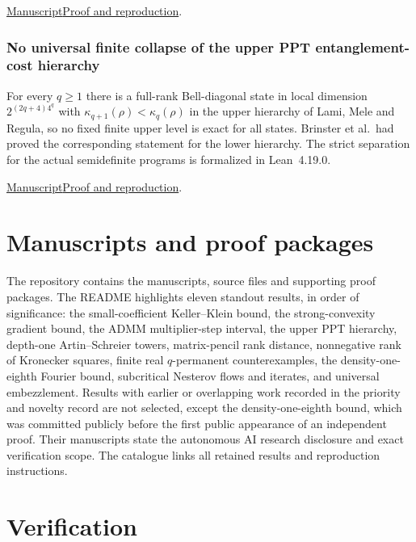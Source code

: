 \documentclass[11pt,a4paper]{article}
\begin{document}
\href{https://github.com/dvgyl/math-and-theory/blob/main/papers/physics/upb-tensor-rank/manuscript.pdf}{Manuscript}\quad\href{https://github.com/dvgyl/math-and-theory/blob/main/papers/physics/upb-tensor-rank/README.md}{Proof and reproduction}.

\subsubsection{No universal finite collapse of the upper PPT entanglement-cost hierarchy}

For every $q\ge1$ there is a full-rank Bell-diagonal state in local dimension $2^{(2q+4)4^q}$ with $\kappa_{q+1}(\rho)<\kappa_q(\rho)$ in the upper hierarchy of Lami, Mele and Regula, so no fixed finite upper level is exact for all states. Brinster et al.\ had proved the corresponding statement for the lower hierarchy. The strict separation for the actual semidefinite programs is formalized in Lean~4.19.0.

\href{https://github.com/dvgyl/math-and-theory/blob/main/papers/physics/upper-ppt-hierarchy/manuscript.pdf}{Manuscript}\quad\href{https://github.com/dvgyl/math-and-theory/blob/main/papers/physics/upper-ppt-hierarchy/README.md}{Proof and reproduction}.

\section{Manuscripts and proof packages}

The repository contains the manuscripts, source files and supporting proof packages. The README highlights eleven standout results, in order of significance: the small-coefficient Keller--Klein bound, the strong-convexity gradient bound, the ADMM multiplier-step interval, the upper PPT hierarchy, depth-one Artin--Schreier towers, matrix-pencil rank distance, nonnegative rank of Kronecker squares, finite real $q$-permanent counterexamples, the density-one-eighth Fourier bound, subcritical Nesterov flows and iterates, and universal embezzlement. Results with earlier or overlapping work recorded in the priority and novelty record are not selected, except the density-one-eighth bound, which was committed publicly before the first public appearance of an independent proof. Their manuscripts state the autonomous AI research disclosure and exact verification scope. The catalogue links all retained results and reproduction instructions.

\section{Verification}
\end{document}
